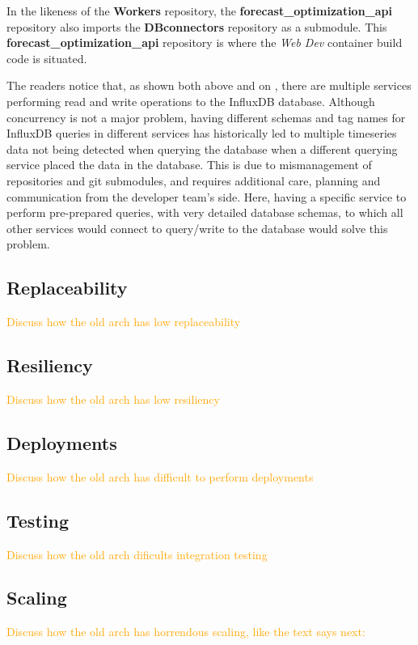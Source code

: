 In the likeness of the \textbf{Workers} repository, the \textbf{forecast\_optimization\_api} repository also imports the \textbf{DBconnectors} repository as a submodule. This \textbf{forecast\_optimization\_api} repository is where the \textit{Web Dev} container build code is situated. 

The readers notice that, as shown both above and on , there are multiple services performing read and write operations to the InfluxDB database. Although concurrency is not a major problem, having different schemas and tag names for InfluxDB queries in different services has historically led to multiple timeseries data not being detected when querying the database when a different querying service placed the data in the database. This is due to mismanagement of repositories and git submodules, and requires additional care, planning and communication from the developer team's side. Here, having a specific service to perform pre-prepared queries, with very detailed database schemas, to which all other services would connect to query/write to the database would solve this problem.

\subsection{Replaceability}\label{methodology:sss:replaceability}
\textcolor{orange}{ Discuss how the old arch has low replaceability}

\subsection{Resiliency}\label{methodology:sss:resiliency}
\textcolor{orange}{ Discuss how the old arch has low resiliency}


\subsection{Deployments}\label{methodology:sss:deployments}
\textcolor{orange}{ Discuss how the old arch has difficult to perform deployments}

\subsection{Testing}\label{methodology:sss:testing}
\textcolor{orange}{ Discuss how the old arch dificults integration testing}

\subsection{Scaling}\label{methodology:sss:scaling}
\textcolor{orange}{ Discuss how the old arch has horrendous scaling, like the text says next:}


